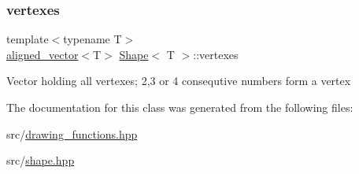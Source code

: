 \mbox{\label{classShape_a50296217cf654fc7b756b67a2f0305c2}} 
\subsubsection{\texorpdfstring{vertexes}{vertexes}}
{\footnotesize\ttfamily template$<$typename T$>$ \\
\mbox{\hyperlink{type__definitions_8hpp_accb98a876f193a416d9c8a02fe22d526}{aligned\+\_\+vector}}$<$T$>$ \mbox{\hyperlink{classShape}{Shape}}$<$ T $>$\+::vertexes\hspace{0.3cm}{\ttfamily [protected]}}

Vector holding all vertexes; 2,3 or 4 consequtive numbers form a vertex 

The documentation for this class was generated from the following files\+:\begin{DoxyCompactItemize}
\item 
src/\mbox{\hyperlink{drawing__functions_8hpp}{drawing\+\_\+functions.\+hpp}}\item 
src/\mbox{\hyperlink{shape_8hpp}{shape.\+hpp}}\end{DoxyCompactItemize}
